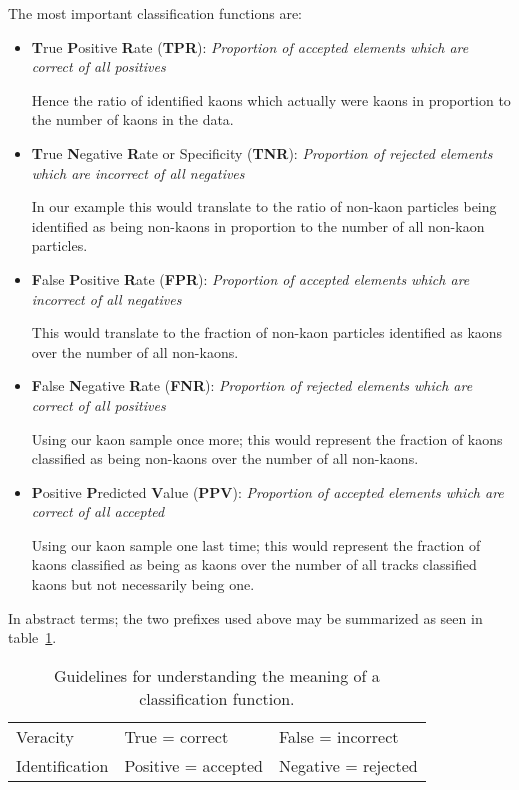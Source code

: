 The most important classification functions are:
\begin{itemize}
    \item \textbf{T}rue \textbf{P}ositive \textbf{R}ate (\textbf{TPR}): \textit{Proportion of accepted elements which are correct of all positives}

    \nobreak
    Hence the ratio of identified kaons which actually were kaons in proportion to the number of kaons in the data.

    \item \textbf{T}rue \textbf{N}egative \textbf{R}ate or Specificity (\textbf{TNR}): \textit{Proportion of rejected elements which are incorrect of all negatives}

    \nobreak
    In our example this would translate to the ratio of non-kaon particles being identified as being non-kaons in proportion to the number of all non-kaon particles.

    \item \textbf{F}alse \textbf{P}ositive \textbf{R}ate (\textbf{FPR}): \textit{Proportion of accepted elements which are incorrect of all negatives}

    \nobreak
    This would translate to the fraction of non-kaon particles identified as kaons over the number of all non-kaons.

    \item \textbf{F}alse \textbf{N}egative \textbf{R}ate (\textbf{FNR}): \textit{Proportion of rejected elements which are correct of all positives}

    \nobreak
    Using our kaon sample once more; this would represent the fraction of kaons classified as being non-kaons over the number of all non-kaons.

    \item \textbf{P}ositive \textbf{P}redicted \textbf{V}alue (\textbf{PPV}): \textit{Proportion of accepted elements which are correct of all accepted}

    \nobreak
    Using our kaon sample one last time; this would represent the fraction of kaons classified as being as kaons over the number of all tracks classified kaons but not necessarily being one.

\end{itemize}

In abstract terms; the two prefixes used above may be summarized as seen in table~\ref{tab:classification_guidelines}.

\vspace{2em}
\begin{table}[ht]
    \centering
    \begin{tabular}{l|ll}
        Veracity & True = correct & False = incorrect \\
        Identification & Positive = accepted & Negative = rejected
    \end{tabular}
    \caption{Guidelines for understanding the meaning of a classification function.}
    \label{tab:classification_guidelines}
\end{table}

